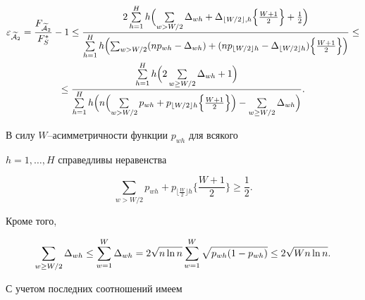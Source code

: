 \begin{pf}
\begin{gather*}


\eps_{\widetilde{\cal A}_{2}}=


\frac{F_{\widetilde{\cal A}_{2}}}{F_{S}^{*}} -1\le


\frac{2 \SH h \Bigl(\sum\limits_{w>W/2} \Delta_{wh} + 


\Delta_{\lfloor W/2 \rfloor,h}


\Bigl\{\frac {W+1}{2}\Bigr \} +\frac {1}{2}\Bigr)}


{\SH h \Bigl(\sum_{w>W/2} (np_{wh}-\Delta_{wh})+


(np_{\lfloor W/2 \rfloor h}-\Delta_{\lfloor W/2 \rfloor h})


\Bigl\{\frac {W+1}{2}\Bigr\}


\Bigr)} \le \\


%


\le \frac{\SH h \Bigl(2\sum\limits_{w\ge W/2} \Delta_{wh} + 1\Bigr)}


{\SH h \Bigl(n \Bigl(


\sum\limits_{w>W/2} p_{wh} + 


p_{\lfloor W/2 \rfloor h}


\Bigl\{\frac {W+1}{2}\Bigr\}


\Bigr) - \sum\limits_{w\ge W/2} \Delta_{wh}\Bigr)}.


\end{gather*}





В силу $W$--асимметричности функции $p_{wh}$ для всякого 


$h=1, \dotsc, H$ справедливы неравенства


$$


\sum_{w>W/2} p_{wh} + 


p_{\lfloor \frac {W}{2}\rfloor h}


\biggl\{\frac {W+1}{2}\biggr\} \ge \frac {1}{2}.


$$


Кроме того, 


$$


\sum_{w\ge W/2} \Delta_{wh} \le \SW \Delta_{wh} =


2\sqrt {n\ln n} \SW \sqrt {p_{wh}(1-p_{wh})}\le


2\sqrt {Wn\ln n}.


$$





С учетом последних соотношений имеем



\end{pf}
